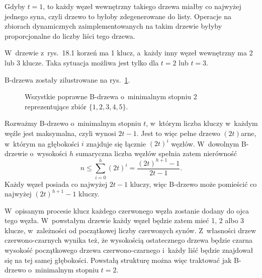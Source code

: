
\exercise %
Gdyby $t=1$, to każdy węzeł wewnętrzny takiego drzewa miałby co najwyżej jednego syna, czyli drzewo to byłoby zdegenerowane do listy.
Operacje na zbiorach dynamicznych zaimplementowanych na takim drzewie byłyby proporcjonalne do liczby liści tego drzewa.

\exercise %
W~drzewie z~rys.\ 18.1 korzeń ma 1 klucz, a~każdy inny węzeł wewnętrzny ma 2 lub 3 klucze.
Taka sytuacja możliwa jest tylko dla $t=2$ lub $t=3$.

\exercise %
B-drzewa zostały zilustrowane na rys.\ \ref{fig:18.1-3}.
\begin{figure}[!ht]
	\centering 
	\caption{Wszystkie poprawne B-drzewa o~minimalnym stopniu 2 reprezentujące zbiór $\{1,2,3,4,5\}$.} \label{fig:18.1-3}
\end{figure}

\exercise %
Rozważmy B-drzewo o~minimalnym stopniu $t$, w~którym liczba kluczy w~każdym węźle jest maksymalna, czyli wynosi $2t-1$.
Jest to więc pełne drzewo $(2t)$\nbhyphen arne, w~którym na głębokości $i$ znajduje się łącznie $(2t)^i$ węzłów.
W~dowolnym B-drzewie o~wysokości $h$ sumaryczna liczba węzłów spełnia zatem nierówność
\[
	n \le \sum_{i=0}^h(2t)^i = \frac{(2t)^{h+1}-1}{2t-1}.
\]
Każdy węzeł posiada co najwyżej $2t-1$ kluczy, więc B-drzewo może pomieścić co najwyżej $(2t)^{h+1}-1$ kluczy.

\exercise %
W~opisanym procesie klucz każdego czerwonego węzła zostanie dodany do ojca tego węzła.
W~powstałym drzewie każdy węzeł będzie zatem mieć 1, 2 albo 3 klucze, w~zależności od początkowej liczby czerwonych synów.
Z~własności drzew czerwono-czarnych wynika też, że wysokością ostatecznego drzewa będzie czarna wysokość początkowego drzewa czerwono-czarnego i~każdy liść będzie znajdował się na tej samej głębokości.
Powstałą strukturę można więc traktować jak B-drzewo o~minimalnym stopniu $t=2$.
